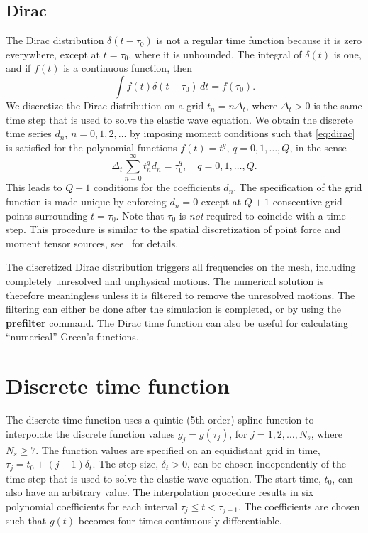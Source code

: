 \documentclass[11pt]{report}
\begin{document}
\subsection{Dirac}
The Dirac distribution $\delta(t-\tau_0)$ is not a regular time function because it is zero everywhere,
except at $t=\tau_0$, where it is unbounded. The integral of $\delta(t)$ is one, and if $f(t)$ is a
continuous function, then
\begin{equation}\label{eq:dirac}
\int f(t)\delta(t-\tau_0)\, dt = f(\tau_0).
\end{equation}
We discretize the Dirac distribution on a grid $t_n = n\Delta_t$, where $\Delta_t>0$ is the same
time step that is used to solve the elastic wave equation. We obtain the discrete time series $d_n$,
$n=0,1,2,\ldots$ by imposing moment conditions such that \eqref{eq:dirac} is satisfied for the
polynomial functions $f(t)=t^q$, $q=0,1,\ldots,Q$, in the sense
\[
\Delta_t \sum_{n=0}^\infty t_n^q d_n = \tau_0^q,\quad q=0,1,\ldots,Q. 
\]
This leads to $Q+1$ conditions for the coefficients $d_n$. The specification of the grid function is
made unique by enforcing $d_n=0$ except at $Q+1$ consecutive grid points surrounding $t=\tau_0$. Note
that $\tau_0$ is {\em not} required to coincide with a time step. This procedure is similar to the
spatial discretization of point force and moment tensor sources, see~\cite{PetSjo-10} for details.

The discretized Dirac distribution triggers all frequencies on the mesh, including completely
unresolved and unphysical motions. The numerical solution is therefore meaningless unless it is
filtered to remove the unresolved motions. The filtering can either be done after the simulation is
completed, or by using the {\bf prefilter} command. The Dirac time function can also be useful for
calculating ``numerical'' Green's functions.

\section{Discrete time function}

The discrete time function uses a quintic (5th order) spline function to interpolate the discrete
function values $g_j = g(\tau_j)$, for $j=1,2,\ldots, N_s$, where $N_s\geq 7$. The function values
are specified on an equidistant grid in time, $\tau_j = t_0 + (j-1) \delta_t$. The step size,
$\delta_t>0$, can be chosen independently of the time step that is used to solve the elastic wave
equation. The start time, $t_0$, can also have an arbitrary value. The interpolation procedure
results in six polynomial coefficients for each interval $\tau_j\leq t <\tau_{j+1}$. The
coefficients are chosen such that $g(t)$ becomes four times continuously differentiable.
\end{document}
